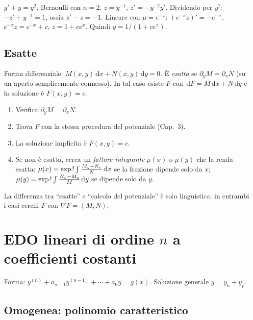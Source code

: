 \documentclass[11pt,a4paper,openany]{book}
\theoremstyle{plain}
\theoremstyle{definition}
\theoremstyle{remark}
\newcommand{\dd}{\,\mathrm{d}}
\begin{document}
\begin{esempio}
$y'+y=y^2$. Bernoulli con $n=2$. $z=y^{-1}$, $z'=-y^{-2}y'$. Dividendo per
$y^2$: $-z'+y^{-1}=1$, ossia $z'-z=-1$. Lineare con $\mu=e^{-x}$:
$(e^{-x}z)'=-e^{-x}$, $e^{-x}z=e^{-x}+c$, $z=1+ce^x$. Quindi
$y=1/(1+ce^x)$.
\end{esempio}

\subsection{Esatte}

Forma differenziale: $M(x,y)\dd x+N(x,y)\dd y=0$. \`E \emph{esatta} se
$\partial_y M=\partial_x N$ (su un aperto semplicemente connesso). In tal caso
esiste $F$ con $\dd F=M\dd x+N\dd y$ e la soluzione \`e $F(x,y)=c$.

\begin{ricetta}
\begin{enumerate}[leftmargin=*]
  \item Verifica $\partial_y M=\partial_x N$.
  \item Trova $F$ con la stessa procedura del potenziale (Cap.~3).
  \item La soluzione implicita \`e $F(x,y)=c$.
  \item Se non \`e esatta, cerca un \emph{fattore integrante} $\mu(x)$ o
        $\mu(y)$ che la renda esatta:
        $\mu(x)=\exp\\!\int\frac{M_y-N_x}{N}\dd x$ se la frazione dipende solo
        da $x$; $\mu(y)=\exp\\!\int\frac{N_x-M_y}{M}\dd y$ se dipende solo
        da $y$.
\end{enumerate}
\end{ricetta}

\begin{nota}
La differenza tra ``esatte'' e ``calcolo del potenziale'' \`e solo linguistica:
in entrambi i casi cerchi $F$ con $\nabla F=(M,N)$.
\end{nota}

\section{EDO lineari di ordine $n$ a coefficienti costanti}

Forma: $y^{(n)}+a_{n-1}y^{(n-1)}+\cdots+a_0 y=g(x)$. Soluzione generale
$y=y_h+y_p$.

\subsection{Omogenea: polinomio caratteristico}
\end{document}
